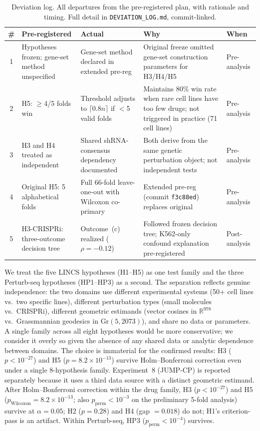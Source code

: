 \documentclass[11pt]{article}
\begin{document}
\begin{table}[t]
\centering
\caption{Deviation log. All departures from the pre-registered plan, with
rationale and timing. Full detail in \texttt{DEVIATION\_LOG.md},
commit-linked.}
\label{tab:deviations}
\small
\begin{tabular}{cp{3.2cm}p{3.2cm}p{3.8cm}l}
\toprule
\# & Pre-registered & Actual & Why & When \\
\midrule
1 & Hypotheses frozen; gene-set method unspecified &
  Gene-set method declared in extended pre-reg &
  Original freeze omitted gene-set construction parameters for H3/H4/H5 &
  Pre-analysis \\
2 & H5: $\geq$4/5 folds win &
  Threshold adjusts to $\lceil 0.8 n \rceil$ if $<$5 valid folds &
  Maintains 80\% win rate when rare cell lines have too few drugs;
  not triggered in practice (71 cell lines) &
  Pre-analysis \\
3 & H3 and H4 treated as independent &
  Shared shRNA-consensus dependency documented &
  Both derive from the same genetic perturbation object; not independent tests &
  Pre-analysis \\
4 & Original H5: 5 alphabetical folds &
  Full 66-fold leave-one-out with Wilcoxon co-primary &
  Extended pre-reg (commit \texttt{f3c88ed}) replaces original &
  Pre-analysis \\
5 & H3-CRISPRi: three-outcome decision tree &
  Outcome~(c) realized ($\rho = -0.12$) &
  Followed frozen decision tree; K562-only confound explanation pre-registered &
  Post-analysis \\
\bottomrule
\end{tabular}
\end{table}

We treat the five LINCS hypotheses (H1--H5) as one test family and the
three Perturb-seq hypotheses (HP1--HP3) as a second. The separation
reflects genuine independence: the two domains use different experimental
systems (50+ cell lines vs.\ two specific lines), different perturbation types
(small molecules vs.\ CRISPRi), different geometric estimands (vector
cosines in $\mathbb{R}^{978}$ vs.\ Grassmannian geodesics in Gr$(5, 2073)$),
and share no data or parameters. A single family across all eight hypotheses
would be more conservative; we consider it overly so given the absence of
any shared data or analytic dependence between domains. The choice is
immaterial for the confirmed results: H3 ($p < 10^{-27}$) and H5
($p = 8.2 \times 10^{-13}$) survive Holm--Bonferroni correction even
under a single 8-hypothesis family. Experiment~8
(JUMP-CP) is reported separately because it uses a third data source with
a distinct geometric estimand. After Holm--Bonferroni
correction within the drug family, H3 ($p < 10^{-27}$) and H5
($p_{\text{Wilcoxon}} = 8.2 \times 10^{-13}$; also
$p_{\text{perm}} < 10^{-3}$ on the preliminary 5-fold analysis) survive
at $\alpha = 0.05$; H2 ($p = 0.28$) and H4 (gap $= 0.018$) do not;
H1's criterion-pass is an artifact.
Within Perturb-seq, HP3 ($p_{\text{perm}} < 10^{-4}$) survives.
\end{document}
